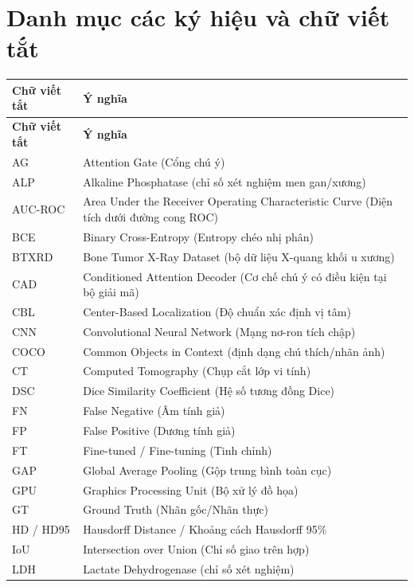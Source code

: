 \chapter*{Danh mục các ký hiệu và chữ viết tắt}
\label{danhmuctuvietat}

\begin{longtable}{|>{\raggedright\arraybackslash}p{3.2cm}|p{10.8cm}|}
\hline
\textbf{Chữ viết tắt} & \textbf{Ý nghĩa} \\
\hline
\endfirsthead
\hline
\textbf{Chữ viết tắt} & \textbf{Ý nghĩa} \\
\hline
\endhead
AG & Attention Gate (Cổng chú ý) \\ \hline
ALP & Alkaline Phosphatase (chỉ số xét nghiệm men gan/xương) \\ \hline
AUC-ROC & Area Under the Receiver Operating Characteristic Curve (Diện tích dưới đường cong ROC) \\ \hline
BCE & Binary Cross-Entropy (Entropy chéo nhị phân) \\ \hline
BTXRD & Bone Tumor X-Ray Dataset (bộ dữ liệu X-quang khối u xương) \\ \hline
CAD & Conditioned Attention Decoder (Cơ chế chú ý có điều kiện tại bộ giải mã) \\ \hline
CBL & Center-Based Localization (Độ chuẩn xác định vị tâm) \\ \hline
CNN & Convolutional Neural Network (Mạng nơ-ron tích chập) \\ \hline
COCO & Common Objects in Context (định dạng chú thích/nhãn ảnh) \\ \hline
CT & Computed Tomography (Chụp cắt lớp vi tính) \\ \hline
DSC & Dice Similarity Coefficient (Hệ số tương đồng Dice) \\ \hline
FN & False Negative (Âm tính giả) \\ \hline
FP & False Positive (Dương tính giả) \\ \hline
FT & Fine-tuned / Fine-tuning (Tinh chỉnh) \\ \hline
GAP & Global Average Pooling (Gộp trung bình toàn cục) \\ \hline
GPU & Graphics Processing Unit (Bộ xử lý đồ họa) \\ \hline
GT & Ground Truth (Nhãn gốc/Nhãn thực) \\ \hline
HD / HD95 & Hausdorff Distance / Khoảng cách Hausdorff 95\% \\ \hline
IoU & Intersection over Union (Chỉ số giao trên hợp) \\ \hline
LDH & Lactate Dehydrogenase (chỉ số xét nghiệm) \\ \hline

\end{longtable}
